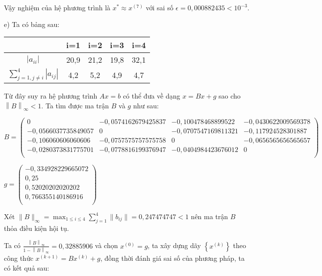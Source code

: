 Vậy nghiệm của hệ phương trình là $x^* \approx x^{(7)} $ với sai số $\epsilon=0,000882435<10^{-3}$.\par

e) Ta có bảng sau:\par

\begin{longtable}{|c|c|c|c|c|}\hline
&i=1&i=2&i=3&i=4\\ \hline
\endhead
$\left|a_{ii} \right|$&20,9&21,2&19,8&32,1\\ \hline
$\sum\limits_{j=1, j\neq i}^{4} \left|a_{ij}\right|$&4,2&5,2&4,9&4,7\\ \hline
\end{longtable}

Từ đây suy ra hệ phương trình $Ax=b$ có thể đưa về dạng $x=Bx+g$ sao cho $\left\|B\right\|_{\infty} <1$.
Ta tìm được ma trận $B$ và $g$ như sau:\par

\begin{small}
$B=\begin{pmatrix}
0&-0,0574162679425837&-0,100478468899522&-0,0430622009569378\\
-0,0566037735849057&0&-0,0707547169811321&-0,117924528301887\\
-0,106060606060606&-0,0757575757575758&0&-0,0656565656565657\\
-0,0280373831775701&-0,0778816199376947&-0,0404984423676012&0\\
\end{pmatrix}$
\end{small}
$g=\begin{pmatrix}
-0,334928229665072\\
0,25\\
0,52020202020202\\
0,766355140186916\\
\end{pmatrix}$\par

Xét $\|B\|_{\infty} =\max_{1\leqslant i\leqslant 4}\sum\limits_{j=1}^{4}{\|b_{ij}\|}=0,247474747<1$ nên ma trận $B$ thỏa điều kiện hội tụ.\par

Ta có $\frac{\left\|B\right\|_{\infty} }{ 1-\left\|B\right\|_{\infty }}= 0,32885906$ và chọn $x^{(0)}=g$, ta xây dựng dãy $\left\{x^{(k)}\right\}$ theo công thức $x^{(k+1)}=Bx^{(k)}+g$, đồng thời đánh giá sai số của phương pháp, ta có kết quả sau:

